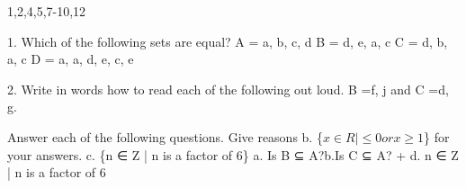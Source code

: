 \documentclass[]{article}
\title{}
\author{}
\begin{document}
\maketitle

1,2,4,5,7-10,12

1. Which of the following sets are equal? 
A = {a, b, c, d} 
B = {d, e, a, c} 
C = {d, b, a, c} 
D = {a, a, d, e, c, e} 

2. Write in words how to read each of the following out loud. 
B ={f, j } and C ={d, g}. 


Answer each of the following questions. Give reasons 
b. \{$x \in R | ≤ 0 orx \ge 1$\} 
for your answers. 
c. \{n ∈ Z | n is a factor of 6\} 
a. Is B ⊆ A?b.Is 
C ⊆ A? 
+ 
d. {n ∈ Z | n is a factor of 6}

\section{}
\end{document}
